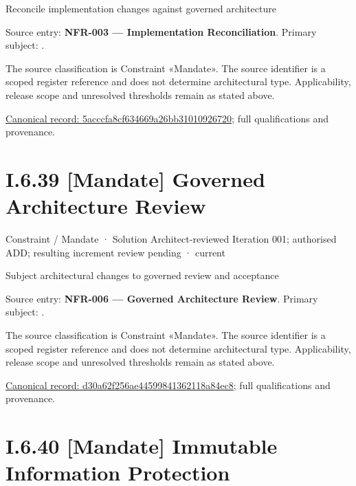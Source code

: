 Reconcile implementation changes against governed architecture



Source entry: \textbf{NFR-003 — Implementation Reconciliation}. Primary subject: \texttt{}.



The source classification is Constraint «Mandate». The source identifier is a scoped register reference and does not determine architectural type. Applicability, release scope and unresolved thresholds remain as stated above.


{\footnotesize \href{../../../../continuum/motivation/constraint/mandate/5acccfa8cf634669a26bb31010926720.md}{Canonical record: 5acccfa8cf634669a26bb31010926720}; full qualifications and provenance.}\par
\section*{I.6.39 [Mandate] Governed Architecture Review}
\label{navigation:I.6.39}

\label{element:d30a62f256ae44599841362118a84ec8}
{\small Constraint / Mandate · Solution Architect-reviewed Iteration 001; authorised ADD; resulting increment review pending · current}\par

Subject architectural changes to governed review and acceptance



Source entry: \textbf{NFR-006 — Governed Architecture Review}. Primary subject: \texttt{}.



The source classification is Constraint «Mandate». The source identifier is a scoped register reference and does not determine architectural type. Applicability, release scope and unresolved thresholds remain as stated above.


{\footnotesize \href{../../../../continuum/motivation/constraint/mandate/d30a62f256ae44599841362118a84ec8.md}{Canonical record: d30a62f256ae44599841362118a84ec8}; full qualifications and provenance.}\par
\section*{I.6.40 [Mandate] Immutable Information Protection}
\label{navigation:I.6.40}

